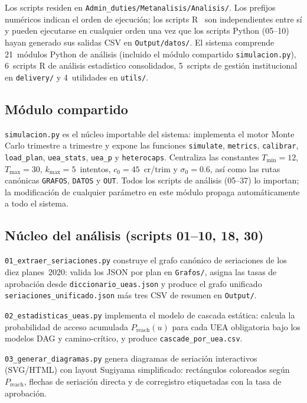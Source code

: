 \documentclass[11pt,letterpaper]{article}
\begin{document}
\begin{sloppypar}
Los scripts residen en \texttt{Admin\_duties/Metanalisis/Analisis/}.
Los prefijos numéricos indican el orden de ejecución; los scripts
R~\cite{RCoreTeam2024} son independientes entre sí y pueden ejecutarse en
cualquier orden una vez que los scripts Python (05--10) hayan generado sus
salidas CSV en \texttt{Output/datos/}.
El sistema comprende 21~módulos Python de análisis (incluido el módulo
compartido \texttt{simulacion.py}), 6~scripts R de análisis estadístico
consolidados, 5~scripts de gestión institucional en \texttt{delivery/}
y 4~utilidades en \texttt{utils/}.

\subsection{Módulo compartido}

\texttt{simulacion.py}
es el núcleo importable del sistema: implementa el motor Monte Carlo trimestre
a trimestre y expone las funciones \texttt{simulate}, \texttt{metrics},
\texttt{calibrar}, \texttt{load\_plan}, \texttt{uea\_stats}, \texttt{uea\_p}
y \texttt{heterocaps}.
Centraliza las constantes $T_{\min}=12$, $T_{\max}=30$, $k_{\max}=5$~intentos,
$c_0=45$~cr/trim y $\sigma_0=0.6$, así como las rutas canónicas
\texttt{GRAFOS}, \texttt{DATOS} y \texttt{OUT}.
Todos los scripts de análisis (05--37) lo importan; la modificación de
cualquier parámetro en este módulo propaga automáticamente a todo el sistema.

\subsection{Núcleo del análisis (scripts 01--10, 18, 30)}

\texttt{01\_extraer\_seriaciones.py}
construye el grafo canónico de seriaciones de los diez planes~2020:
valida los JSON por plan en \texttt{Grafos/}, asigna las tasas de aprobación
desde \texttt{diccionario\_ueas.json} y produce el grafo unificado
\texttt{seriaciones\_unificado.json} más tres CSV de resumen en \texttt{Output/}.

\texttt{02\_estadisticas\_ueas.py}
implementa el modelo de cascada estática: calcula la probabilidad de acceso
acumulada $P_{\mathrm{reach}}(u)$ para cada UEA obligatoria bajo los modelos
DAG y camino-crítico, y produce \texttt{cascade\_por\_uea.csv}.

\texttt{03\_generar\_diagramas.py}
genera diagramas de seriación interactivos (SVG/HTML) con layout Sugiyama
simplificado: rectángulos coloreados según $P_{\mathrm{reach}}$, flechas
de seriación directa y de corregistro etiquetadas con la tasa de aprobación.


\end{sloppypar}
\end{document}
